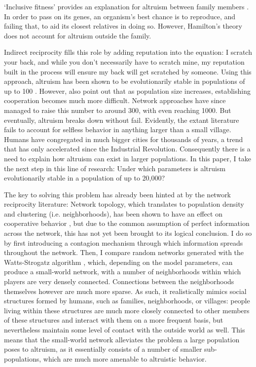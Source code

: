 \documentclass{JASSS}
\begin{document}
`Inclusive fitness' provides an explanation for altruism between family members \citep{Hamilton1964}. In order to pass on its genes, an organism's best chance is to reproduce, and failing that, to aid its closest relatives in doing so. However, Hamilton's theory does not account for altruism outside the family.

Indirect reciprocity fills this role by adding reputation into the equation: I scratch your back, and while you don't necessarily have to scratch mine, my reputation built in the process will ensure my back will get scratched by someone. Using this approach, altruism has been shown to be evolutionarily stable in populations of up to 100 \citep{Nowak1998}. However, \cite{Nowak1998} also point out that as population size increases, establishing cooperation becomes much more difficult. Network approaches have since managed to raise this number to around 300, with \cite{Peleteiro2014} even reaching 1000. But eventually, altruism breaks down without fail. Evidently, the extant literature fails to account for selfless behavior in anything larger than a small village. Humans have congregated in much bigger cities for thousands of years, a trend that has only accelerated since the Industrial Revolution. Consequently there is a need to explain how altruism can exist in larger populations. In this paper, I take the next step in this line of research: Under which parameters is altruism evolutionarily stable in a population of up to 20,000?

The key to solving this problem has already been hinted at by the network reciprocity literature: Network topology, which translates to population density and clustering (i.e. neighborhoods), has been shown to have an effect on cooperative behavior \citep{Santos2008,Peleteiro2014}, but due to the common assumption of perfect information across the network, this has not yet been brought to its logical conclusion. I do so by first introducing a contagion mechanism through which information spreads throughout the network. Then, I compare random networks generated with the  Watts-Strogatz algorithm \citep{Watts1998}, which, depending on the model parameters, can produce a small-world network, with a number of neighborhoods within which players are very densely connected. Connections between the neighborhoods themselves however are much more sparse. As such, it realistically mimics social structures formed by humans, such as families, neighborhoods, or villages: people living within these structures are much more closely connected to other members of these structures and interact with them on a more frequent basis, but nevertheless maintain some level of contact with the outside world as well. This means that the small-world network alleviates the problem a large population poses to altruism, as it essentially consists of a number of smaller sub-populations, which are much more amenable to altruistic behavior.
\end{document}
